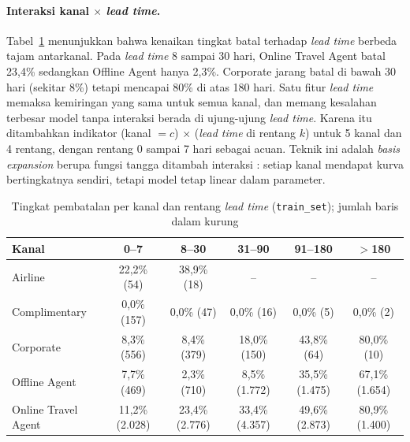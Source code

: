 \paragraph{Interaksi kanal $\times$ \textit{lead time}.} Tabel~\ref{tab:lr-kanal-lead} menunjukkan bahwa kenaikan tingkat batal terhadap \textit{lead time} berbeda tajam antarkanal. Pada \textit{lead time} 8 sampai 30 hari, Online Travel Agent batal 23,4\% sedangkan Offline Agent hanya 2,3\%. Corporate jarang batal di bawah 30 hari (sekitar 8\%) tetapi mencapai 80\% di atas 180 hari. Satu fitur \textit{lead time} memaksa kemiringan yang sama untuk semua kanal, dan memang kesalahan terbesar model tanpa interaksi berada di ujung-ujung \textit{lead time}. Karena itu ditambahkan indikator (kanal $= c$) $\times$ (\textit{lead time} di rentang $k$) untuk 5 kanal dan 4 rentang, dengan rentang 0 sampai 7 hari sebagai acuan. Teknik ini adalah \textit{basis expansion} berupa fungsi tangga ditambah interaksi \cite[Sec.~5.1]{hastie2009esl}: setiap kanal mendapat kurva bertingkatnya sendiri, tetapi model tetap linear dalam parameter.

\begin{table}[H]
	\centering
	\caption{Tingkat pembatalan per kanal dan rentang \textit{lead time} (\texttt{train\_set}); jumlah baris dalam kurung}
	\label{tab:lr-kanal-lead}
	\footnotesize
	\setlength{\tabcolsep}{3pt}
	\begin{tabular}{l c c c c c}
		\toprule
		\textbf{Kanal} & \textbf{0--7} & \textbf{8--30} & \textbf{31--90} & \textbf{91--180} & \textbf{$>$180} \\
		\midrule
		Airline & 22,2\% (54) & 38,9\% (18) & -- & -- & -- \\
		Complimentary & 0,0\% (157) & 0,0\% (47) & 0,0\% (16) & 0,0\% (5) & 0,0\% (2) \\
		Corporate & 8,3\% (556) & 8,4\% (379) & 18,0\% (150) & 43,8\% (64) & 80,0\% (10) \\
		Offline Agent & 7,7\% (469) & 2,3\% (710) & 8,5\% (1.772) & 35,5\% (1.475) & 67,1\% (1.654) \\
		Online Travel Agent & 11,2\% (2.028) & 23,4\% (2.776) & 33,4\% (4.357) & 49,6\% (2.873) & 80,9\% (1.400) \\
		\bottomrule
	\end{tabular}
\end{table}

